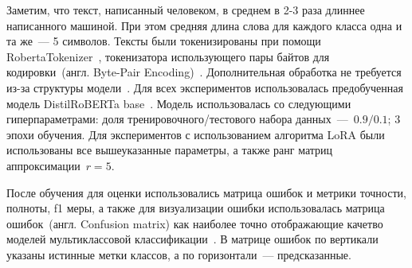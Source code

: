 Заметим, что текст, написанный человеком, в среднем в 2-3 раза длиннее написанного машиной. При этом средняя длина слова для каждого класса одна и та же~--- 5 символов. Тексты были токенизированы при помощи RobertaTokenizer~\cite{wolf2019huggingface}, токенизатора использующего пары байтов для кодировки~(англ. Byte-Pair Encoding)~\cite{wang2020neural}. Дополнительная обработка не требуется из-за структуры модели~\cite{vaswani2017attention}. Для всех экспериментов использовалась предобученная модель DistilRoBERTa base~\cite{liu2019roberta}. Модель использовалась со следующими гиперпараметрами: доля тренировочного/тестового набора данных~---~$0.9/0.1$; 3 эпохи обучения. Для экспериментов с использованием алгоритма LoRA были использованы все вышеуказанные параметры, а также ранг матриц аппроксимации~$r = 5$.

После обучения для оценки использовались матрица ошибок и метрики точности, полноты, f1 меры, а также для визуализации ошибки использовалась матрица ошибок~(англ. Confusion matrix) как наиболее точно отображающие качетво моделей мультиклассовой классификации~\cite{grandini2020metrics}. В матрице ошибок по вертикали указаны истинные метки классов, а по горизонтали~--- предсказанные.

